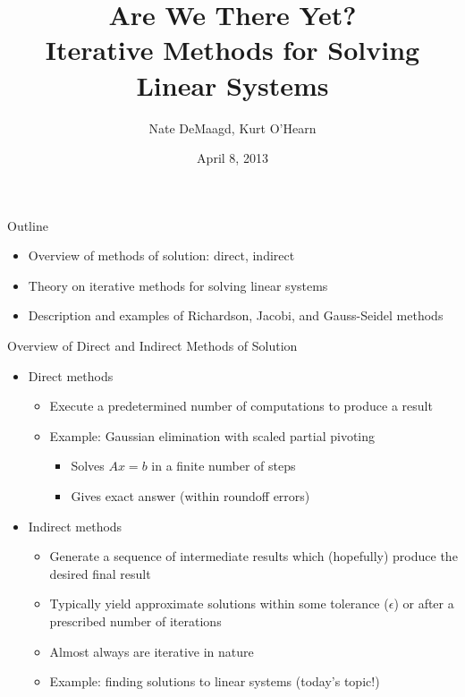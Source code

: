\documentclass[9pt, serif]{beamer}
\title[Iterative Methods for Solving Linear Systems]
{Are We There Yet?\\Iterative Methods for Solving Linear Systems}
\author[]
{Nate DeMaagd, Kurt O'Hearn}
\institute[Grand Valley State University]
{MTH 499-02}
\date{April 8, 2013}
\newlength{\wideitemsep}
\let\olditem\item
\renewcommand{\item}{\setlength{\itemsep}{\wideitemsep}\olditem}
\newcommand{\bi}{\begin{itemize}}
\newcommand{\ei}{\end{itemize}}
\begin{document}
\begin{frame}
    \titlepage
\end{frame}


\begin{frame}{Outline}
    \pause
    \bi
        \item Overview of methods of solution: direct, indirect \pause
        \item Theory on iterative methods for solving linear systems \pause
        \item Description and examples of Richardson, Jacobi, and Gauss-Seidel methods
    \ei
\end{frame}


\begin{frame}{Overview of Direct and Indirect Methods of Solution}
    \pause
    \bi
        \item Direct methods \pause
        \bi
            \item Execute a predetermined number of computations to produce a result \pause
            \item Example: Gaussian elimination with scaled partial pivoting \pause
    	    \bi
	            \item Solves $Ax=b$ in a finite number of steps \pause
        	    \item Gives exact answer (within roundoff errors) \pause
    	    \ei
        \ei
        \item Indirect methods \pause
        \bi
            \item Generate a sequence of intermediate results which (hopefully) produce the desired final result \pause
	        \item Typically yield approximate solutions within some tolerance ($\epsilon$) or after a prescribed number of iterations \pause
	        \item Almost always are iterative in nature \pause
	        \item Example: finding solutions to linear systems (today's topic!)
	    \ei
    \ei
\end{frame}
\end{document}
